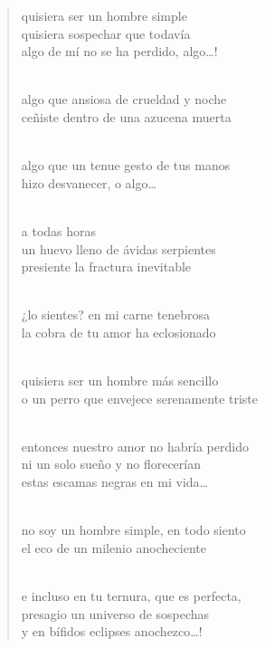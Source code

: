 \documentclass[a4paper, 12pt]{article}
\begin{document}
\begin{verse}
    
quisiera ser un hombre simple\\
quisiera sospechar que todavía\\
algo de mí no se ha perdido, algo…!\\
~ 

algo que ansiosa de crueldad y noche\\
ceñiste dentro de una azucena muerta\\
~ 

algo que un tenue gesto de tus manos\\
hizo desvanecer, o algo…\\
~ 

a todas horas\\
un huevo lleno de ávidas serpientes\\
presiente la fractura inevitable\\
~ 

¿lo sientes? en mi carne tenebrosa\\
la cobra de tu amor ha eclosionado\\
~ 

quisiera ser un hombre más sencillo\\
o un perro que envejece serenamente triste\\
~ 

entonces nuestro amor no habría perdido\\
ni un solo sueño y no florecerían\\
estas escamas negras en mi vida…\\
~ 

no soy un hombre simple, en todo siento\\
el eco de un milenio anocheciente\\
~ 

e incluso en tu ternura, que es perfecta,\\
presagio un universo de sospechas\\
y en bífidos eclipses anochezco…!\\

\end{verse}

\pagebreak
\end{document}

